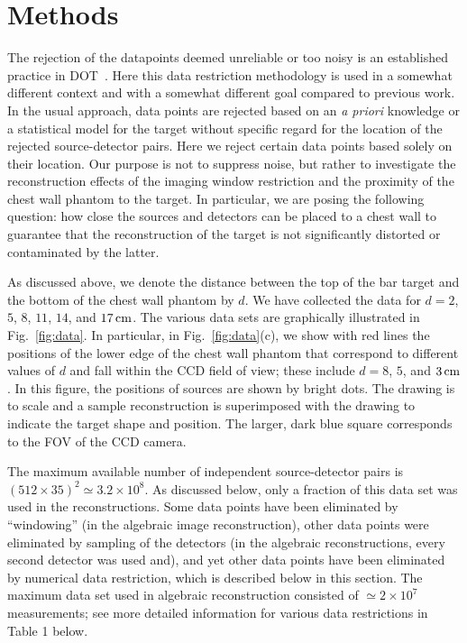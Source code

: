\section{Methods}
\label{sec:3_methods}

The rejection of the datapoints deemed unreliable or too noisy is an established practice in   DOT~\cite{blasi_07_1,franceschini_07_1,roche-labarbe_10_1,orihuela-espina_10_1}. Here this data restriction methodology is used in a somewhat different context and with a somewhat different goal compared to previous work. In the usual approach, data points are rejected based on an {\em a priori} knowledge or a statistical model for the target without specific regard for the location of the rejected source-detector pairs. Here we reject certain data points based solely on their location. Our purpose is not to suppress noise, but rather to investigate the reconstruction effects of the imaging window restriction and the proximity of the chest wall phantom to the target. In particular, we are posing the following question: how close the sources and detectors can be placed to a chest wall to guarantee that the reconstruction of the target is not significantly distorted or contaminated by the latter.

As discussed above, we denote the distance between the top of the bar target and the bottom of the chest wall phantom by $d$. We have collected the data for $d=2$, $5$, $8$, $11$, $14$, and $17\,{\rm cm}$. The various data sets are graphically illustrated in Fig.~\ref{fig:data}. In particular, in Fig.~\ref{fig:data}(c), we show with red lines the positions of the lower edge of the chest wall phantom that correspond to different values of $d$ and fall within the CCD field of view; these include $d=8$, $5$, and $3\,{\rm cm}$. In this figure, the positions of sources are shown by bright dots. The drawing is to scale and a sample reconstruction is superimposed with the drawing to indicate the target shape and position. The larger, dark blue square corresponds to the FOV of the CCD camera.

The maximum available number of independent source-detector pairs is $(512\times 35)^2\simeq 3.2\times 10^8$. As discussed below, only a fraction of this data set was used in the reconstructions. Some data
points have been eliminated by ``windowing'' (in the algebraic image reconstruction), other data points were eliminated by sampling of the detectors (in the algebraic reconstructions, every second detector was
used and), and yet other data points have been eliminated by numerical data restriction, which is described below in this section. The maximum data set used in algebraic reconstruction consisted of $\simeq 2\times 10^7$ measurements; see more detailed information for various data restrictions in Table 1 below.

